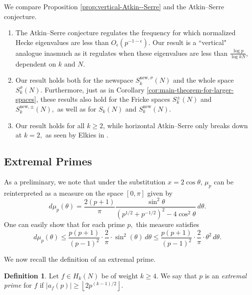 \documentclass[11pt,letterpaper,reqno]{amsart}
\theoremstyle{definition}
\newtheorem{definition}[theorem]{Definition}
\numberwithin{equation}{section}
\numberwithin{figure}{section}
\numberwithin{table}{section}
\let\subsectiontemp\subsection
\renewcommand{\subsection}[1]{ 
    \subsectiontemp{#1} \hfill\vspace{0.5\linespacing} 
}
\newcommand{\nw}{\mathrm{new}}
\begin{document}
We compare Proposition \ref{prop:vertical-Atkin--Serre} and the Atkin--Serre conjecture.

\begin{enumerate}
        \item The Atkin--Serre conjecture regulates the frequency for which normalized Hecke eigenvalues are less than $O_\epsilon\!\left( p^{-1 - \epsilon} \right)$. Our result is a ``vertical" analogue inasmuch as it regulates when these eigenvalues are less than $\frac{\log p}{\log kN}$, dependent on $k$ and $N.$
         \item Our result holds both for the newspace $S_k^{\nw, \sigma}(N)$ and the whole space $S_k^\sigma(N).$ Furthermore, just as in Corollary \ref{cor:main-theorem-for-larger-spaces}, these results also hold for the Fricke spaces $S_k^\pm(N)$ and $S_k^{\nw, \pm}(N),$ as well as for $S_k(N)$ and $S_k^\nw(N).$
        \item Our result holds for all $k \geq 2$, while horizontal Atkin--Serre only breaks down at $k = 2,$ as seen by Elkies in \cite{Elk87}.
    \end{enumerate}

\subsection{Extremal Primes}
\label{subsection:extremal-primes}

As a preliminary, we note that under the substitution $x = 2\cos \theta$, $\mu_p$ can be reinterpreted as a measure on the space $[0, \pi]$ given by
\begin{equation}
    d\mu_p(\theta) = \frac{2(p + 1)}{\pi} \frac{\sin^2 \theta}{\left( p^{1/2} + p^{-1/2} \right)^2 - 4 \cos^2 \theta} \, d \theta. \label{eqn:def-mu-p-theta}
\end{equation}
One can easily show that for each prime $p,$ this measure satisfies
\begin{equation}
        d\mu_p (\theta) \leq \frac{p(p + 1)}{(p - 1)^2} \cdot \frac{2}{\pi} \cdot \sin^2(\theta) \, d\theta \leq \frac{p(p + 1)}{(p - 1)^2} \cdot \frac{2}{\pi} \cdot \theta^2 \, d\theta. \label{eqn:upper-bound-for-mu-p-in-terms-of-theta}
    \end{equation}

We now recall the definition of an extremal prime.

{
\renewcommand{\thetheorem}{\ref{def:extremal-prime}}
\begin{definition}
    Let $f \in H_k (N)$ be of weight $k \geq 4.$ We say that $p$ is an \textit{extremal prime} for $f$ if
    $\left| a_f(p)  \right| \geq \left\lfloor 2 p^{(k - 1)/2} \right\rfloor.$
\end{definition}
\addtocounter{theorem}{-1}
}
\end{document}
